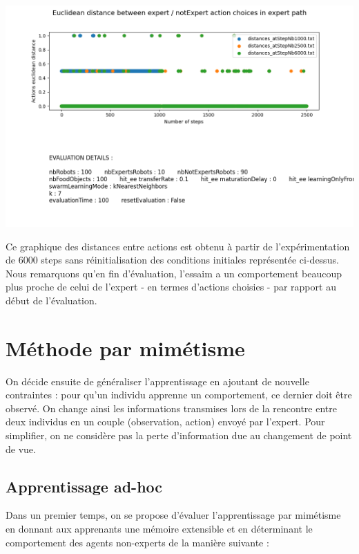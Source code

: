 \documentclass[a4paper, 12pt]{report}
\begin{document}
    \includegraphics[scale=0.5]{distances_knn.png}
    
    Ce graphique des distances entre actions est obtenu à partir de l'expérimentation de 6000 steps sans réinitialisation des conditions initiales représentée ci-dessus. Nous remarquons qu'en fin d'évaluation, l'essaim a un comportement beaucoup plus proche de celui de l'expert - en termes d'actions choisies - par rapport au début de l'évaluation.
    
    
    
    
    
	\section{Méthode par mimétisme}
	On décide ensuite de généraliser l'apprentissage en ajoutant de nouvelle contraintes : pour qu'un individu apprenne un comportement, ce dernier doit être observé. On change ainsi les informations transmises lors de la rencontre entre deux individus en un couple (observation, action) envoyé par l'expert.
	Pour simplifier, on ne considère pas la perte d'information due au changement de point de vue.
	\subsection{Apprentissage ad-hoc}
	Dans un premier temps, on se propose d'évaluer l'apprentissage par mimétisme en donnant aux apprenants une mémoire extensible et en déterminant le comportement des agents non-experts de la manière suivante :

	
\end{document}
